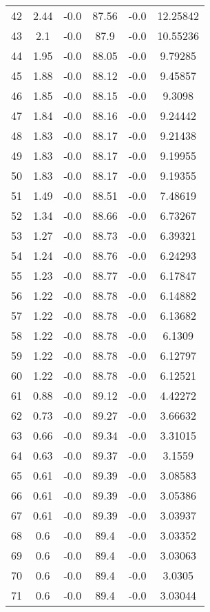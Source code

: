 \begin{center}
\begin{longtable}{c c c c c c}
    42 & 2.44 & -0.0 & 87.56 & -0.0 & 12.25842 \\
    43 & 2.1 & -0.0 & 87.9 & -0.0 & 10.55236 \\
    44 & 1.95 & -0.0 & 88.05 & -0.0 & 9.79285 \\
    45 & 1.88 & -0.0 & 88.12 & -0.0 & 9.45857 \\
    46 & 1.85 & -0.0 & 88.15 & -0.0 & 9.3098 \\
    47 & 1.84 & -0.0 & 88.16 & -0.0 & 9.24442 \\
    48 & 1.83 & -0.0 & 88.17 & -0.0 & 9.21438 \\
    49 & 1.83 & -0.0 & 88.17 & -0.0 & 9.19955 \\
    50 & 1.83 & -0.0 & 88.17 & -0.0 & 9.19355 \\
    51 & 1.49 & -0.0 & 88.51 & -0.0 & 7.48619 \\
    52 & 1.34 & -0.0 & 88.66 & -0.0 & 6.73267 \\
    53 & 1.27 & -0.0 & 88.73 & -0.0 & 6.39321 \\
    54 & 1.24 & -0.0 & 88.76 & -0.0 & 6.24293 \\
    55 & 1.23 & -0.0 & 88.77 & -0.0 & 6.17847 \\
    56 & 1.22 & -0.0 & 88.78 & -0.0 & 6.14882 \\
    57 & 1.22 & -0.0 & 88.78 & -0.0 & 6.13682 \\
    58 & 1.22 & -0.0 & 88.78 & -0.0 & 6.1309 \\
    59 & 1.22 & -0.0 & 88.78 & -0.0 & 6.12797 \\
    60 & 1.22 & -0.0 & 88.78 & -0.0 & 6.12521 \\
    61 & 0.88 & -0.0 & 89.12 & -0.0 & 4.42272 \\
    62 & 0.73 & -0.0 & 89.27 & -0.0 & 3.66632 \\
    63 & 0.66 & -0.0 & 89.34 & -0.0 & 3.31015 \\
    64 & 0.63 & -0.0 & 89.37 & -0.0 & 3.1559 \\
    65 & 0.61 & -0.0 & 89.39 & -0.0 & 3.08583 \\
    66 & 0.61 & -0.0 & 89.39 & -0.0 & 3.05386 \\
    67 & 0.61 & -0.0 & 89.39 & -0.0 & 3.03937 \\
    68 & 0.6 & -0.0 & 89.4 & -0.0 & 3.03352 \\
    69 & 0.6 & -0.0 & 89.4 & -0.0 & 3.03063 \\
    70 & 0.6 & -0.0 & 89.4 & -0.0 & 3.0305 \\
    71 & 0.6 & -0.0 & 89.4 & -0.0 & 3.03044 \\

\end{longtable}
\end{center}
